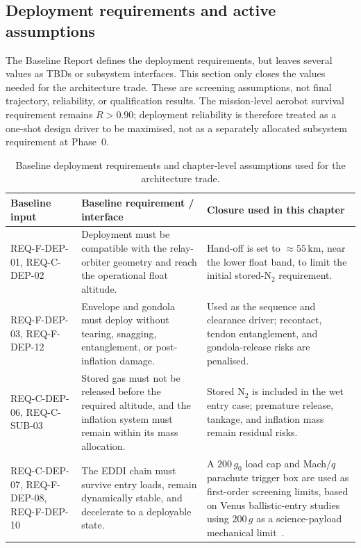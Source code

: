 \subsection{Deployment requirements and active assumptions}
\label{sec:dep-active-assumptions}

The Baseline Report defines the deployment requirements, but leaves several values as TBDs or subsystem interfaces. This section only closes the values needed for the architecture trade. These are screening assumptions, not final trajectory, reliability, or qualification results. The mission-level aerobot survival requirement remains $R>0.90$; deployment reliability is therefore treated as a one-shot design driver to be maximised, not as a separately allocated subsystem requirement at Phase~0.

\begin{table}[H]
\centering
\caption{Baseline deployment requirements and chapter-level assumptions used for the architecture trade.}
\label{tab:deployment-retained-reqs}
\footnotesize
\renewcommand{\arraystretch}{1.12}
\begin{tabularx}{\textwidth}{@{}p{} X X@{}}
\toprule
\textbf{Baseline input} & \textbf{Baseline requirement / interface} & \textbf{Closure used in this chapter} \\
\midrule
REQ-F-DEP-01, REQ-C-DEP-02 & Deployment must be compatible with the relay-orbiter geometry and reach the operational float altitude. & Hand-off is set to $\approx55\,\mathrm{km}$, near the lower float band, to limit the initial stored-N$_2$ requirement. \\
REQ-F-DEP-03, REQ-F-DEP-12 & Envelope and gondola must deploy without tearing, snagging, entanglement, or post-inflation damage. & Used as the sequence and clearance driver; recontact, tendon entanglement, and gondola-release risks are penalised. \\
REQ-C-DEP-06, REQ-C-SUB-03 & Stored gas must not be released before the required altitude, and the inflation system must remain within its mass allocation. & Stored N$_2$ is included in the wet entry case; premature release, tankage, and inflation mass remain residual risks. \\
REQ-C-DEP-07, REQ-F-DEP-08, REQ-F-DEP-10 & The EDDI chain must survive entry loads, remain dynamically stable, and decelerate to a deployable state. & A $200\,g_0$ load cap and Mach/$q$ parachute trigger box are used as first-order screening limits, based on Venus ballistic-entry studies using $200\,g$ as a science-payload mechanical limit~\cite{Prabhu2013VenusEntry}. \\

\end{tabularx}
\end{table}
